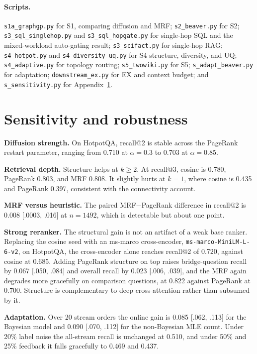 \documentclass[11pt]{article}
\begin{document}
\paragraph{Scripts.} \texttt{s1a\_graphgp.py} for S1, comparing diffusion and MRF; \texttt{s2\_beaver.py}
for S2; \texttt{s3\_sql\_singlehop.py} and \texttt{s3\_sql\_hopgate.py} for single-hop SQL and the
mixed-workload auto-gating result; \texttt{s3\_scifact.py} for single-hop RAG; \texttt{s4\_hotpot.py}
and \texttt{s4\_diversity\_uq.py} for S4 structure, diversity, and UQ; \texttt{s4\_adaptive.py} for
topology routing; \texttt{s5\_twowiki.py} for S5; \texttt{s\_adapt\_beaver.py} for adaptation;
\texttt{downstream\_ex.py} for EX and context budget; and \texttt{s\_sensitivity.py} for
Appendix~\ref{app:sens}.

\section{Sensitivity and robustness}\label{app:sens}

\textbf{Diffusion strength.} On HotpotQA, recall@2 is stable across the PageRank restart parameter,
ranging from 0.710 at $\alpha\!=\!0.3$ to 0.703 at $\alpha\!=\!0.85$.

\textbf{Retrieval depth.} Structure helps at $k\!\ge\!2$. At recall@3, cosine is 0.780, PageRank 0.803,
and MRF 0.808. It slightly hurts at $k\!=\!1$, where cosine is 0.435 and PageRank 0.397, consistent with
the connectivity account.

\textbf{MRF versus heuristic.} The paired MRF$-$PageRank difference in recall@2 is 0.008 [.0003, .016]
at $n\!=\!1492$, which is detectable but about one point.

\textbf{Strong reranker.} The structural gain is not an artifact of a weak base ranker. Replacing the
cosine seed with an ms-marco cross-encoder, \texttt{ms-marco-MiniLM-L-6-v2}, on HotpotQA, the
cross-encoder alone reaches recall@2 of 0.720, against cosine at 0.685. Adding PageRank structure on top
raises bridge-question recall by 0.067 [.050, .084] and overall recall by 0.023 [.006, .039], and the
MRF again degrades more gracefully on comparison questions, at 0.822 against PageRank at 0.700. Structure
is complementary to deep cross-attention rather than subsumed by it.

\textbf{Adaptation.} Over 20 stream orders the online gain is 0.085 [.062, .113] for the Bayesian model
and 0.090 [.070, .112] for the non-Bayesian MLE count. Under 20\% label noise the all-stream recall is
unchanged at 0.510, and under 50\% and 25\% feedback it falls gracefully to 0.469 and 0.437.



\end{document}
